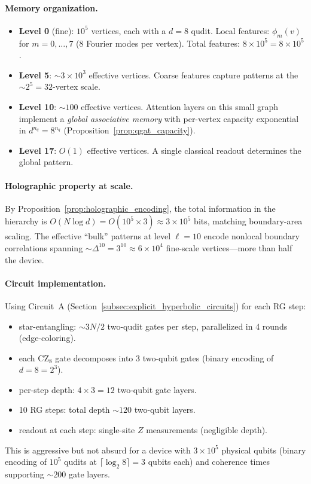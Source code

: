 \documentclass[11pt,oneside]{amsbook}
\numberwithin{equation}{section}
\theoremstyle{plain}
\theoremstyle{definition}
\theoremstyle{remark}
\begin{document}
\paragraph{Memory organization.}
\begin{itemize}
\item \textbf{Level 0} (fine): $10^5$ vertices, each with a $d=8$ qudit.
Local features: $\phi_m(v)$ for $m=0,\ldots,7$ (8 Fourier modes per vertex).
Total features: $8\times 10^5 = 8\times 10^5$.
\item \textbf{Level 5}: $\sim 3\times 10^3$ effective vertices.
Coarse features capture patterns at the $\sim 2^5=32$-vertex scale.
\item \textbf{Level 10}: $\sim 100$ effective vertices.
Attention layers on this small graph implement a \emph{global associative memory}
with per-vertex capacity exponential in $d^{n_q}=8^{n_q}$ (Proposition~\ref{prop:qgat_capacity}).
\item \textbf{Level 17}: $O(1)$ effective vertices.  A single classical readout determines
the global pattern.
\end{itemize}

\paragraph{Holographic property at scale.}
By Proposition~\ref{prop:holographic_encoding}, the total information in the hierarchy is
$O(N\log d)=O(10^5\times 3)\approx 3\times 10^5$ bits,
matching boundary-area scaling.
The effective ``bulk'' patterns at level $\ell=10$ encode nonlocal boundary correlations
spanning $\sim\Delta^{10}=3^{10}\approx 6\times 10^4$ fine-scale vertices---more than half
the device.

\paragraph{Circuit implementation.}
Using Circuit~A (Section~\ref{subsec:explicit_hyperbolic_circuits}) for each RG step:
\begin{itemize}
\item star-entangling: $\sim 3N/2$ two-qudit gates per step, parallelized in 4 rounds (edge-coloring).
\item each $\mathrm{CZ}_8$ gate decomposes into $3$ two-qubit gates (binary encoding of $d=8=2^3$).
\item per-step depth: $4\times 3=12$ two-qubit gate layers.
\item 10 RG steps: total depth $\sim 120$ two-qubit layers.
\item readout at each step: single-site $Z$ measurements (negligible depth).
\end{itemize}
This is aggressive but not absurd for a device with $3\times 10^5$ physical qubits
(binary encoding of $10^5$ qudits at $\lceil\log_2 8\rceil=3$ qubits each)
and coherence times supporting $\sim 200$ gate layers.
\end{document}
